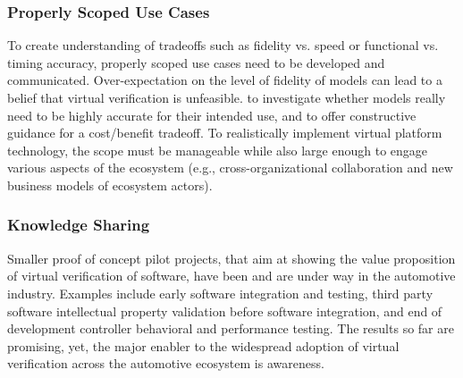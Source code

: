 \subsubsection*{Properly Scoped Use Cases}
To create understanding of tradeoffs such as fidelity vs. speed or functional vs. timing accuracy, properly scoped use cases need to be developed and communicated.
Over-expectation on the level of fidelity of models can lead to a belief that virtual verification is unfeasible.
 to investigate whether models really need to be highly accurate for their intended use, and to offer constructive guidance for a cost/benefit tradeoff.
To realistically implement virtual platform technology, the scope must be manageable while also large enough to engage various aspects of the ecosystem (e.g., cross-organizational collaboration and new business models of ecosystem actors).


\subsubsection*{Knowledge Sharing}
Smaller proof of concept pilot projects, that aim at showing the value proposition of virtual verification of software, have been and are under way in the automotive industry.
Examples include early software integration and testing, third party software intellectual property validation before software integration, and end of development controller behavioral and performance testing.
The results so far are promising, yet, the major enabler to the widespread adoption of virtual verification across the automotive ecosystem is awareness.

